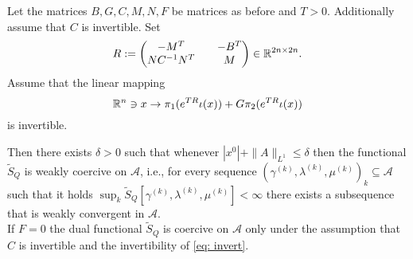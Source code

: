\documentclass[11pt]{article}
\newcommand{\JG}[1]{{\color{blue} JG:  #1}}
\begin{document}
\begin{proposition}\label{prop: coer}
Let the matrices $B,G,C,M,N, F$ be matrices as before and $T>0$. Additionally assume that $C$ is invertible. 
Set 
\begin{equation}\label{eq: defR}
R := \begin{pmatrix} -M^T && - B^T \\ N C^{-1}N^T &&  M \end{pmatrix} \in \mathbb R^{2n \times 2n}.
\end{equation}
Assume that the linear mapping 
\begin{equation} \label{eq: invert}
\mathbb R^n \ni x \rightarrow \pi_1 (e^{TR}  \iota(x)) + G \pi_2 (e^{TR} \iota(x)) 
\end{equation}
is invertible.

Then there exists $\delta>0$ such that whenever $|x^0| + \| A \|_{L^1} \leq \delta$ then the functional $\tilde{S}_Q$ is weakly coercive on $\mathcal{A}$, i.e., for every sequence $(\gamma^{(k)},\lambda^{(k)}, \mu^{(k)})_k \subseteq \mathcal{A}$ such that it holds $\sup_k \tilde{S}_Q[\gamma^{(k)},\lambda^{(k)}, \mu^{(k)}] < \infty$ there exists a subsequence that is weakly convergent in $\mathcal{A}$.  \\
If $F=0$ the dual functional $\tilde{S}_Q$ is coercive on $\mathcal{A}$ only under the assumption that $C$ is invertible and the invertibility of \eqref{eq: invert}.

\end{proposition}
\end{document}

